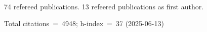 74 refereed publications. 13 refeered publications as first author.

Total citations~=~4948; h-index~=~37 (2025-06-13)